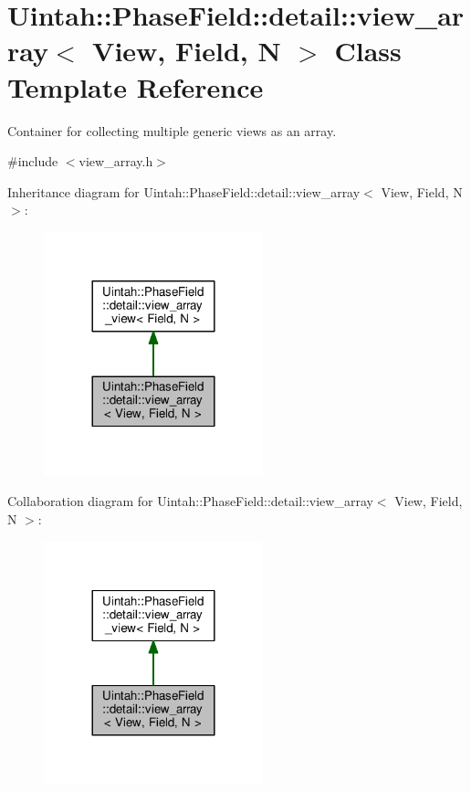 \hypertarget{classUintah_1_1PhaseField_1_1detail_1_1view__array}{}\section{Uintah\+:\+:Phase\+Field\+:\+:detail\+:\+:view\+\_\+array$<$ View, Field, N $>$ Class Template Reference}
\label{classUintah_1_1PhaseField_1_1detail_1_1view__array}


Container for collecting multiple generic views as an array.  




{\ttfamily \#include $<$view\+\_\+array.\+h$>$}



Inheritance diagram for Uintah\+:\+:Phase\+Field\+:\+:detail\+:\+:view\+\_\+array$<$ View, Field, N $>$\+:\nopagebreak
\begin{figure}[H]
\begin{center}
\leavevmode
\includegraphics[width=180pt]{classUintah_1_1PhaseField_1_1detail_1_1view__array__inherit__graph}
\end{center}
\end{figure}


Collaboration diagram for Uintah\+:\+:Phase\+Field\+:\+:detail\+:\+:view\+\_\+array$<$ View, Field, N $>$\+:\nopagebreak
\begin{figure}[H]
\begin{center}
\leavevmode
\includegraphics[width=180pt]{classUintah_1_1PhaseField_1_1detail_1_1view__array__coll__graph}
\end{center}
\end{figure}
